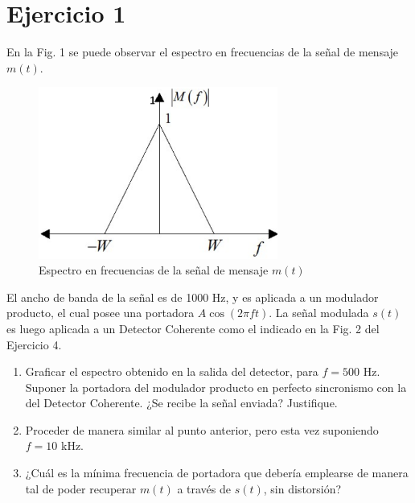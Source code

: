 \section{Ejercicio 1}

En la Fig. 1 se puede observar el espectro en frecuencias de la señal de mensaje $m(t)$.

\begin{figure}[h!]
    \centering
    \includegraphics[width=0.7\textwidth]{imagenes/Parte_1/Actividad_1/fig1.png}
    \caption{Espectro en frecuencias de la señal de mensaje $m(t)$}
\end{figure}

El ancho de banda de la señal es de 1000 Hz, y es aplicada a un modulador producto, el cual posee una portadora $A \cos(2 \pi f t)$. La señal modulada $s(t)$ es luego aplicada a un Detector Coherente como el indicado en la Fig. 2 del Ejercicio 4.

\begin{enumerate}[label=\alph*)]
    \item Graficar el espectro obtenido en la salida del detector, para $f = 500$ Hz. Suponer la portadora del modulador producto en perfecto sincronismo con la del Detector Coherente. ¿Se recibe la señal enviada? Justifique.
    \item Proceder de manera similar al punto anterior, pero esta vez suponiendo $f = 10$ kHz.
    \item ¿Cuál es la mínima frecuencia de portadora que debería emplearse de manera tal de poder recuperar $m(t)$ a través de $s(t)$, sin distorsión?
\end{enumerate}
